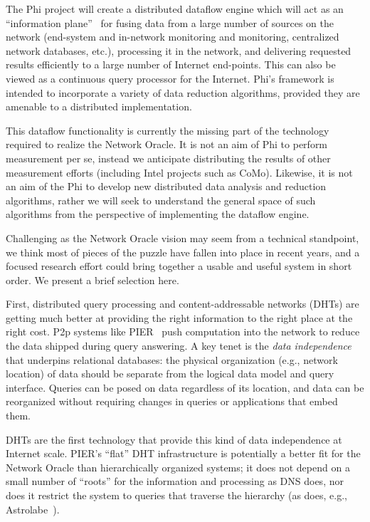 \documentclass[twocolumn,10pt]{article}
\def\Sys{Network Oracle\xspace}
\def\Lrp{Phi\xspace}
\begin{document}
The \Lrp project will create a distributed dataflow engine which will
act as an ``information plane''~\cite{worlds04_infoplanes} for fusing
data from a large number of sources on the network (end-system and
in-network monitoring and monitoring, centralized network databases,
etc.), processing it in the 
network, and delivering requested results efficiently to a large
number of Internet end-points.   This can also be viewed as a
continuous query processor for the Internet.  \Lrp's framework is
intended to incorporate a variety of data reduction algorithms,
provided they are amenable to a distributed implementation. 

This dataflow functionality is currently the missing part of the
technology required to realize the \Sys.  It is not an aim of
\Lrp to perform measurement per se, instead we anticipate distributing the
results of other measurement efforts (including Intel projects such as
CoMo).  Likewise, it is not an aim of the \Lrp to develop
new distributed data analysis and reduction algorithms, rather we will
seek to understand the general space of such algorithms from the
perspective of implementing the dataflow engine. 

Challenging as the \Sys vision may seem from a technical standpoint, we think
most of pieces of the puzzle have fallen into place in recent years,
and a focused research effort could bring together a usable and useful 
system in short order.  We present a brief selection here. 

First, distributed query processing and content-addressable networks
(DHTs) are getting much better at providing the right information to
the right place at the right cost.  P2p systems like
PIER~\cite{huebsch_vldb03} push computation into the
network to reduce the data shipped during query
answering.  A key tenet is the {\em data independence} that
underpins relational databases: the physical
organization (e.g., network location) of data should be separate from
the logical data model and query interface.  Queries can 
be posed on data regardless of its location, and data can be
reorganized without requiring changes in queries or 
applications that embed them.

DHTs are the first technology that provide this kind of
data independence at Internet scale.  PIER's
``flat'' DHT infrastructure is potentially a better fit for the \Sys
than hierarchically organized systems; it does not depend on a small
number of ``roots'' for the information and processing as DNS does, nor
does it restrict the system to queries that traverse the hierarchy (as
does, e.g., Astrolabe~\cite{astrolabe}).
\end{document}
